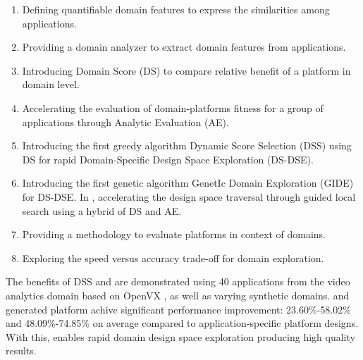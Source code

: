 \begin{enumerate}
    \item Defining quantifiable domain features to express the similarities among applications.
    \item Providing a domain analyzer to extract domain features from applications.
    \item Introducing Domain Score (DS) to compare relative benefit of a platform in domain level.
    \item Accelerating the evaluation of domain-platforms fitness for a group of applications through Analytic Evaluation (AE).
    \item Introducing the first greedy algorithm Dynamic Score Selection (DSS) using DS for rapid Domain-Specific Design Space Exploration (DS-DSE).
    \item Introducing the first genetic algorithm GenetIc Domain Exploration (GIDE) for DS-DSE. In \ga, accelerating the design space traversal through guided local search using a hybrid of DS and AE.
    \item Providing a methodology to evaluate platforms in context of domains.
    \item Exploring the speed versus accuracy trade-off for domain exploration.
\end{enumerate}


The benefits of DSS and \ga are demonstrated using 40 applications from the video analytics domain based on OpenVX \cite{Intel, AMD}, as well as varying synthetic domains. 
 and \ga generated platform achive significant performance improvement: 23.60\%-58.02\% and 48.09\%-74.85\% on average compared to application-specific platform designs.
With this, \ga enables rapid domain design space exploration producing high quality results.

